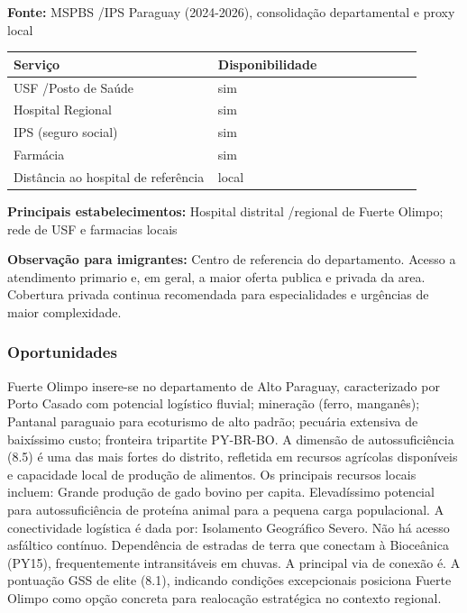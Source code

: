 \textbf{Fonte:} MSPBS /\allowbreak  IPS Paraguay (2024-2026), consolidação
departamental e proxy local

{\def\LTcaptype{none} %
\begin{longtable}{@{}>{\raggedright\arraybackslash}p{0.45\linewidth} >{\raggedright\arraybackslash}p{0.45\linewidth}@{}}
\toprule\noalign{}
Serviço & Disponibilidade \\
\midrule\noalign{}
\endhead
\bottomrule\noalign{}
\endlastfoot
USF /\allowbreak  Posto de Saúde & sim \\
Hospital Regional & sim \\
IPS (seguro social) & sim \\
Farmácia & sim \\
Distância ao hospital de referência & local \\
\end{longtable}
}

\textbf{Principais estabelecimentos:} Hospital distrital /\allowbreak  regional de
Fuerte Olimpo; rede de USF e farmacias locais

\textbf{Observação para imigrantes:} Centro de referencia do
departamento. Acesso a atendimento primario e, em geral, a maior oferta
publica e privada da area. Cobertura privada continua recomendada para
especialidades e urgências de maior complexidade.
\newpage

\subsubsection*{Oportunidades}\label{oport-fuerte-olimpo-1701}
Fuerte Olimpo insere-se no departamento de Alto Paraguay, caracterizado por Porto Casado com potencial logístico fluvial; mineração (ferro, manganês); Pantanal paraguaio para ecoturismo de alto padrão; pecuária extensiva de baixíssimo custo; fronteira tripartite PY-BR-BO. A dimensão de autossuficiência (8.5) é uma das mais fortes do distrito, refletida em recursos agrícolas disponíveis e capacidade local de produção de alimentos. Os principais recursos locais incluem: Grande produção de gado bovino per capita. Elevadíssimo potencial para autossuficiência de proteína animal para a pequena carga populacional. A conectividade logística é dada por: Isolamento Geográfico Severo. Não há acesso asfáltico contínuo. Dependência de estradas de terra que conectam à Bioceânica (PY15), frequentemente intransitáveis em chuvas. A principal via de conexão é. A pontuação GSS de elite (8.1), indicando condições excepcionais posiciona Fuerte Olimpo como opção concreta para realocação estratégica no contexto regional.

